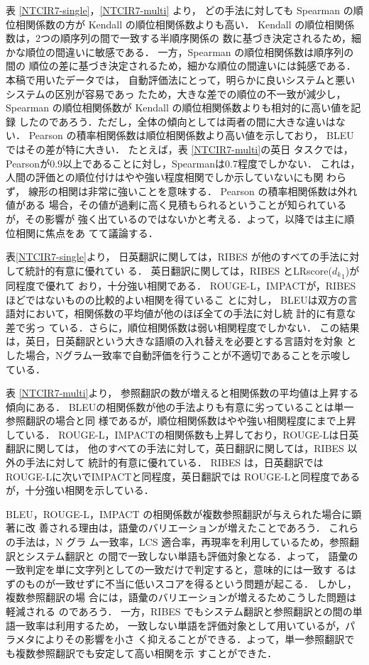\documentclass[japanese]{jnlp_1.4}
\begin{document}
表 \ref{NTCIR7-single}，\ref{NTCIR7-multi} より，
どの手法に対しても Spearman の順
位相関係数の方が Kendall の順位相関係数よりも高い．
Kendall の順位相関係数は，2つの順序列の間で一致する半順序関係の
数に基づき決定されるため，細かな順位の間違いに敏感である．
一方，Spearman の順位相関係数は順序列の間の
順位の差に基づき決定されるため，細かな順位の間違いには鈍感である．
本稿で用いたデータでは，
自動評価法にとって，明らかに良いシステムと悪いシステムの区別が容易であっ
たため，大きな差での順位の不一致が減少し，
Spearman の順位相関係数が
Kendall の順位相関係数よりも相対的に高い値を記録
したのであろう．ただし，全体の傾向としては両者の間に大きな違いはない．
Pearson の積率相関係数は順位相関係数より高い値を示しており，
BLEUではその差が特に大きい．
たとえば，表 \ref{NTCIR7-multi}の英日
タスクでは，Pearsonが0.9以上であることに対し，Spearmanは0.7程度でしかない．
これは，人間の評価との順位付けはやや強い程度相関でしか示していないにも関
わらず，
線形の相関は非常に強いことを意味する．
Pearson の積率相関係数は外れ値がある
場合，その値が過剰に高く見積もられるということが知られているが，その影響が
強く出ているのではないかと考える．よって，以降では主に順位相関に焦点をあ
てて議論する．

表\ref{NTCIR7-single}より，
日英翻訳に関しては，RIBES が他のすべての手法に対して統計的有意に優れてい
る．
英日翻訳に関しては，RIBES とLRscore(${d_k}_1$)が同程度で優れて
おり，十分強い相関である．
ROUGE-L，IMPACTが，RIBES ほどではないものの比較的よい相関を得ているこ
とに対し，
BLEUは双方の言語対において，相関係数の平均値が他のほぼ全ての手法に対し統
計的に有意な差で劣っ
ている．さらに，順位相関係数は弱い相関程度でしかない．
この結果は，英日，日英翻訳という大きな語順の入れ替えを必要とする言語対を対象
とした場合，Nグラム一致率で自動評価を行うことが不適切であることを示唆し
ている．

表 \ref{NTCIR7-multi}より，
参照翻訳の数が増えると相関係数の平均値は上昇する傾向にある．
BLEUの相関係数が他の手法よりも有意に劣っていることは単一参照翻訳の場合と同
様であるが，順位相関係数はやや強い相関程度にまで上昇している．
ROUGE-L，IMPACTの相関係数も上昇しており，ROUGE-Lは日英翻訳に関しては，
他のすべての手法に対して，英日翻訳に関しては，RIBES 以外の手法に対して
統計的有意に優れている．
RIBES は，日英翻訳ではROUGE-Lに次いでIMPACTと同程度，英日翻訳では
ROUGE-Lと同程度であるが，十分強い相関を示している．

BLEU，ROUGE-L，IMPACT の相関係数が複数参照翻訳が与えられた場合に顕著に改
善される理由は，語彙のバリエーションが増えたことであろう．
これらの手法は，N グラ
ム一致率，LCS 適合率，再現率を利用しているため，参照翻訳とシステム翻訳と
の間で一致しない単語も評価対象となる．よって，
語彙の一致判定を単に文字列としての一致だけで判定すると，意味的には一致す
るはずのものが一致せずに不当に低いスコアを得るという問題が起こる．
しかし，複数参照翻訳の場
合には，語彙のバリエーションが増えるためこうした問題は軽減される
のであろう．
一方，RIBES でもシステム翻訳と参照翻訳との間の単語一致率は利用するため，
一致しない単語を評価対象として用いているが，パラメタによりその影響を小さ
く抑えることができる．よって，単一参照翻訳でも複数参照翻訳でも安定して高い相関を示
すことができた．
\end{document}
